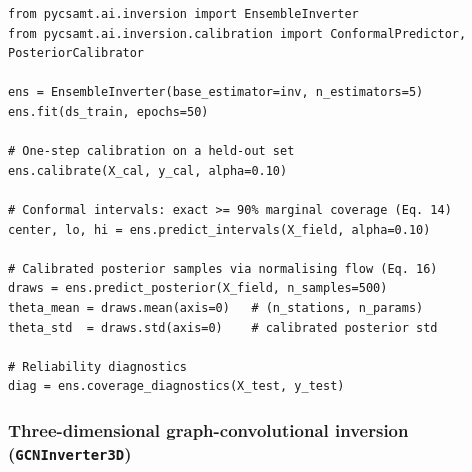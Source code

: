 \documentclass[review,12pt]{elsarticle}
\begin{document}
\begin{lstlisting}[style=pycode, caption={Calibrated posterior uncertainty via conformal prediction and the Gaussianization flow.}]
from pycsamt.ai.inversion import EnsembleInverter
from pycsamt.ai.inversion.calibration import ConformalPredictor, PosteriorCalibrator

ens = EnsembleInverter(base_estimator=inv, n_estimators=5)
ens.fit(ds_train, epochs=50)

# One-step calibration on a held-out set
ens.calibrate(X_cal, y_cal, alpha=0.10)

# Conformal intervals: exact >= 90% marginal coverage (Eq. 14)
center, lo, hi = ens.predict_intervals(X_field, alpha=0.10)

# Calibrated posterior samples via normalising flow (Eq. 16)
draws = ens.predict_posterior(X_field, n_samples=500)
theta_mean = draws.mean(axis=0)   # (n_stations, n_params)
theta_std  = draws.std(axis=0)    # calibrated posterior std

# Reliability diagnostics
diag = ens.coverage_diagnostics(X_test, y_test)
\end{lstlisting}

\subsubsection{Three-dimensional graph-convolutional inversion (\texttt{GCNInverter3D})}
\label{sec:gcninverter}
\end{document}
